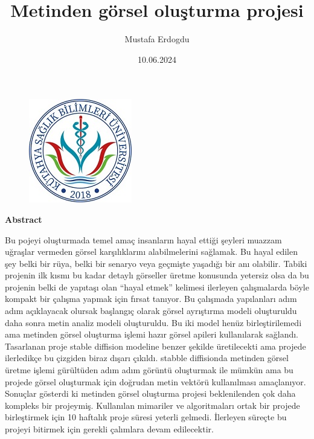 \documentclass[12pt, a4paper]{article}
\title{Metinden görsel oluşturma projesi}
\author{Mustafa Erdogdu}
\date{10.06.2024}
\begin{document}
	
	\begin{figure}
		\centering
		\includegraphics{ksbu.png}
	\end{figure}
	
	\maketitle
	
	\noindent
	\begin{center}
		\textbf{Abstract}
	\end{center}
 	Bu pojeyi oluşturmada temel amaç insanların hayal ettiği şeyleri muazzam uğraşlar vermeden görsel karşılıklarını alabilmelerini sağlamak. Bu hayal edilen şey belki bir rüya, belki bir senaryo veya geçmişte yaşadığı bir anı olabilir. Tabiki projenin ilk kısmı bu kadar detaylı görseller üretme konusunda yetersiz olsa da bu projenin belki de yapıtaşı olan “hayal etmek” kelimesi ilerleyen çalışmalarda böyle kompakt bir çalışma yapmak için fırsat tanıyor.   
 	Bu çalışmada yapılanları adım adım açıklayacak olursak başlangıç olarak görsel ayrıştırma modeli oluşturuldu daha sonra metin analiz modeli oluşturuldu. Bu iki model henüz birleştirilemedi ama metinden görsel oluşturma işlemi hazır görsel apileri kullanılarak sağlandı. Tasarlanan proje stable diffision modeline benzer şekilde üretilecekti ama projede ilerledikçe bu çizgiden biraz dışarı çıkıldı. stabble diffisionda metinden görsel üretme işlemi gürültüden adım adım görüntü oluşturmak ile mümkün ama bu projede görsel oluşturmak için doğrudan metin vektörü kullanılması amaçlanıyor.
 	Sonuçlar gösterdi ki metinden görsel oluşturma projesi beklenilenden çok daha kompleks bir projeymiş. Kullanılan mimariler ve algoritmaları ortak bir projede birleştirmek için 10 haftalık proje süresi yeterli gelmedi. İlerleyen süreçte bu projeyi bitirmek için gerekli çalımlara devam edilecektir.
	
\end{document}
